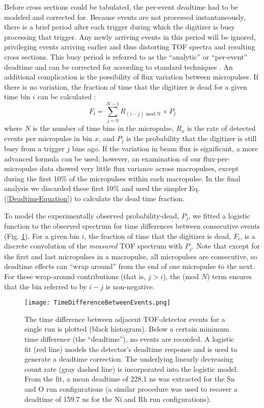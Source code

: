 \documentclass[twocolumn,secnumarabic,amssymb, nobibnotes, aps, prl,
superscriptaddress, nobalancelastpage, floatfix]{revtex4}
\begin{document}
Before cross sections could be tabulated, the per-event deadtime had to be
modeled and corrected for. Because events are not processed
instantaneously, there is a brief period
after each trigger during which the digitizer is busy processing that trigger.
Any newly arriving events in this period will be ignored,
privileging events arriving earlier and thus distorting
TOF spectra and resulting cross sections. This busy period is referred to as the
``analytic'' or ``per-event'' deadtime and can be corrected for according to standard 
techniques
\cite{Moore1980}. An additional complication is the possibility of flux
variation between micropulses. If there is no variation, the fraction of time
that the digitizer is dead for a given time bin $i$ can be calculated \cite{Moore1980}:
\begin{equation}
    F_{i} = \sum^{N-1}_{j=0} R_{(i-j)\text{ mod N}}\times P_{j}
    \label{DeadtimeEquation}
\end{equation}
where $N$ is the number of time bins in the micropulse, $R_{x}$ is the rate of
detected events per micropulse in bin $x$, and $P_{j}$ is the probability that the
digitizer is still busy from a trigger $j$ bins ago.
If the variation in beam flux is significant, a more advanced formula can be
used; however, an examination of our flux-per-micropulse data showed
very little flux variance across macropulses, except during the first 10\%
of the micropulses within each macropulse. In the final analysis we discarded these first
10\% and used the simpler Eq. (\ref{DeadtimeEquation}) to calculate the dead time fraction.

To model the experimentally observed probability-dead, $P_{j}$,
we fitted a logistic function to the observed spectrum for time
differences between consecutive events (Fig.
\ref{TimeDifferenceBetweenEvents}). For a given bin $i$, the fraction of time that the 
digitizer is dead, $F_{i}$, is a discrete convolution of the
\textit{measured} TOF spectrum with $P_{j}$. Note that except for the first and
last micropulses in a macropulse, all micropulses are consecutive, so deadtime effects can
``wrap around'' from the end of one micropulse to the next. For these wrap-around
contributions (that is, $j>i$), the (mod $N$) term ensures that the bin referred
to by $i-j$ is non-negative.
\begin{figure}
    \texttt{[image: TimeDifferenceBetweenEvents.png]}
    \caption{The time difference between adjacent TOF-detector
    events for a single run is plotted (black histogram). Below a certain
minimum time difference (the ``deadtime''), no events are recorded. A logistic
fit (red line) models the detector's deadtime response and is used to generate a
deadtime correction. The underlying linearly decreasing count rate (gray dashed
line) is incorporated into the logistic model. From the fit, a mean deadtime of
228.1 ns was extracted for the Sn and O run configurations (a similar
procedure was used to recover a deadtime of 159.7 ns for the Ni and Rh
run configurations).}
    \label{TimeDifferenceBetweenEvents}
\end{figure}
\end{document}

